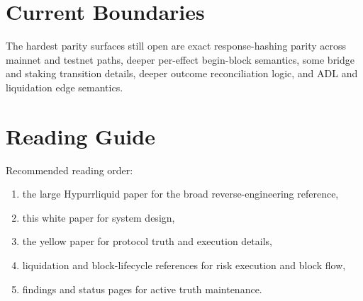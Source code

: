 \documentclass[11pt]{article}
\begin{document}
\section{Current Boundaries}

The hardest parity surfaces still open are exact response-hashing parity across
mainnet and testnet paths, deeper per-effect begin-block semantics, some bridge
and staking transition details, deeper outcome reconciliation logic, and ADL
and liquidation edge semantics.

\section{Reading Guide}

Recommended reading order:

\begin{enumerate}[leftmargin=1.4em]
  \item the large Hypurrliquid paper for the broad reverse-engineering reference,
  \item this white paper for system design,
  \item the yellow paper for protocol truth and execution details,
  \item liquidation and block-lifecycle references for risk execution and block flow,
  \item findings and status pages for active truth maintenance.
\end{enumerate}
\end{document}

